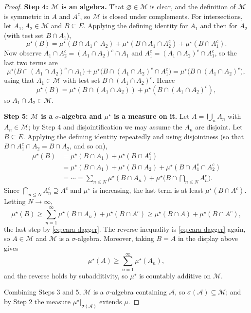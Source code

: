 \documentclass[a4paper]{scrartcl}
\newcommand{\cA}{\mathcal{A}}
\newcommand{\cM}{\mathcal{M}}
\begin{document}
\begin{proof}
	\textbf{Step 4: $\cM$ is an algebra.} That $\varnothing \in \cM$ is clear, and the definition of $\cM$ is symmetric in $A$ and $A^c$, so $\cM$ is closed under complements. For intersections, let $A_1, A_2 \in \cM$ and $B \subseteq E$. Applying the defining identity for $A_1$ and then for $A_2$ (with test set $B \cap A_1$),
	$$
	\mu^\star(B) = \mu^\star(B \cap A_1 \cap A_2) + \mu^\star(B \cap A_1 \cap A_2^c) + \mu^\star(B\cap A_1^c).
	$$
	Now observe $A_1 \cap A_2^c = (A_1 \cap A_2)^c \cap A_1$ and $A_1^c = (A_1\cap A_2)^c \cap A_1^c$, so the last two terms are
	$$
	\mu^\star\big(B \cap (A_1\cap A_2)^c \cap A_1\big) + \mu^\star\big(B \cap (A_1 \cap A_2)^c \cap A_1^c\big) = \mu^\star\big(B \cap (A_1\cap A_2)^c\big),
	$$
	using that $A_1 \in \cM$ with test set $B \cap (A_1 \cap A_2)^c$. Hence
	$$
	\mu^\star(B) = \mu^\star(B \cap (A_1 \cap A_2)) + \mu^\star(B \cap (A_1\cap A_2)^c),
	$$
	so $A_1 \cap A_2 \in \cM$.

	\textbf{Step 5: $\cM$ is a $\sigma$-algebra and $\mu^\star$ is a measure on it.} Let $A = \bigcup_n A_n$ with $A_n \in \cM$; by Step 4 and disjointification we may assume the $A_n$ are disjoint. Let $B \subseteq E$. Applying the defining identity repeatedly and using disjointness (so that $B \cap A_1^c \cap A_2 = B \cap A_2$, and so on),
	\begin{align*}
		\mu^\star(B) &= \mu^\star(B\cap A_1) + \mu^\star(B \cap A_1^c) \\
		&= \mu^\star(B\cap A_1) + \mu^\star(B\cap A_2) + \mu^\star(B \cap A_1^c \cap A_2^c) \\
		&= \cdots = \sum_{n \leq N} \mu^\star(B \cap A_n) + \mu^\star\Big( B \cap \bigcap_{n \leq N} A_n^c \Big).
	\end{align*}
	Since $\bigcap_{n \leq N} A_n^c \supseteq A^c$ and $\mu^\star$ is increasing, the last term is at least $\mu^\star(B \cap A^c)$. Letting $N \to \infty$,
	$$
	\mu^\star(B) \geq \sum_{n=1}^\infty \mu^\star(B \cap A_n) + \mu^\star(B \cap A^c) \geq \mu^\star(B \cap A) + \mu^\star(B \cap A^c),
	$$
	the last step by \eqref{eq:cara-dagger}. The reverse inequality is \eqref{eq:cara-dagger} again, so $A \in \cM$ and $\cM$ is a $\sigma$-algebra. Moreover, taking $B = A$ in the display above gives
	$$
	\mu^\star(A) \geq \sum_{n=1}^\infty \mu^\star(A_n),
	$$
	and the reverse holds by subadditivity, so $\mu^\star$ is countably additive on $\cM$.

	Combining Steps 3 and 5, $\cM$ is a $\sigma$-algebra containing $\cA$, so $\sigma(\cA) \subseteq \cM$; and by Step 2 the measure $\mu^\star|_{\sigma(\cA)}$ extends $\mu$.
\end{proof}
\end{document}
